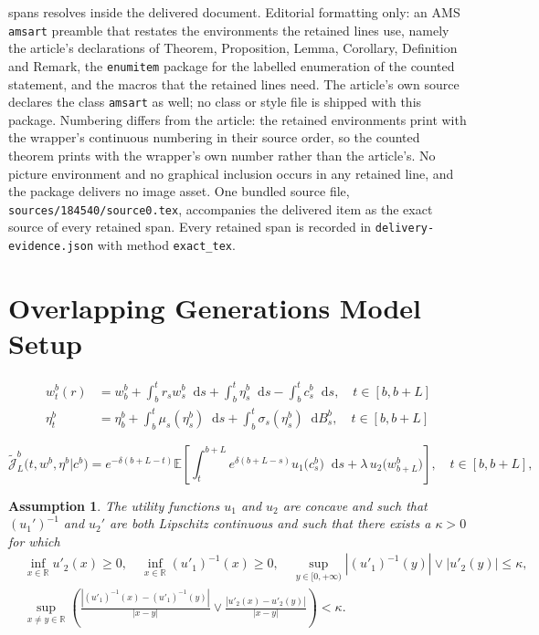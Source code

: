 \documentclass[10pt,a4paper]{amsart}
\theoremstyle{plain}
\theoremstyle{plain}
\newtheorem{ass}{Assumption}
\theoremstyle{definition}
\theoremstyle{remark}
\newcommand{\EE}{\mathbb{E}}
\newcommand{\dd}{\mathop{}\!\mathrm{d}}
\newcommand{\mbR}{\mathbb{R}}
\newcommand{\mcJ}{\mathcal{J}}
\begin{document}
spans resolves inside the delivered document. Editorial formatting only: an AMS \texttt{amsart} preamble that restates the environments the retained lines use, namely the article's declarations of Theorem, Proposition, Lemma, Corollary, Definition and Remark, the \texttt{enumitem} package for the labelled enumeration of the counted statement, and the macros that the retained lines need. The article's own source declares the class \texttt{amsart} as well; no class or style file is shipped with this package. Numbering differs from the article: the retained environments print with the wrapper's continuous numbering in their source order, so the counted theorem prints with the wrapper's own number rather than the article's. No picture environment and no graphical inclusion occurs in any retained line, and the package delivers no image asset. One bundled source file, \texttt{sources/184540/source0.tex}, accompanies the delivered item as the exact source of every retained span. Every retained span is recorded in \texttt{delivery-evidence.json} with method \texttt{exact\_tex}.
\section{Overlapping Generations Model Setup}\label{sec:model_setup}

\begin{align}
%
        w^b_t(r) &= w^b_b + \int_b^t r_s w^{b}_s \dd s + \int_b^t \eta^b_s  \dd s - \int_b^t c_s^b \dd s, \quad t\in [b,b+L]\label{eq:olg_wealth_intro}
        \\
\eta^b_t &= \eta^b_b +\int_{b}^t \mu_s(\eta^b_s) \dd s + \int_{b}^t \sigma_s(\eta^b_s) \dd B^b_s, \quad t\in [b,b+L] \label{eq:olg_income_intro}
%
%
\end{align}

\begin{equation}\label{eq:olg_payoff_discounted}
   \tilde{ \mcJ}^b_{L}\big(t,w^b,\eta^b|c^b\big)=e^{-\delta (b+L-t)}\EE\left[\int_{t}^{b+L} e^{\delta(b+L- s)}u_1\big(c^b_s\big)\dd s + \lambda \, u_2\big(w^b_{b+L}\big)\right], \quad t\in [b,b+L],
\end{equation}

\begin{ass}\label{ass:utility_reg_intro}
     The utility functions $u_1$ and $u_2$ are concave and such that $(u_1')^{-1}$ and $u_2'$ are  both Lipschitz continuous and such that there exists a $\kappa>0$ for which
%
\begin{equation}
\begin{aligned}
     &\inf_{x\in \mbR} u'_2(x) \geq 0, \quad \inf_{x\in \mbR}  (u'_1)^{-1}(x) \geq 0, \quad  \sup_{y \in [0,+\infty)} |(u'_1)^{-1} (y)|\vee |u'_2(y)| \leq \kappa,\\
    & \sup_{x\neq y \in \mbR} \left(\frac{|(u'_1)^{-1}(x)-(u'_1)^{-1}(y)|}{|x-y|} \vee \frac{|u'_2(x)-u'_2(y)|}{|x-y|} \right)<\kappa.
\end{aligned}
\end{equation}
\end{ass}
\end{document}
